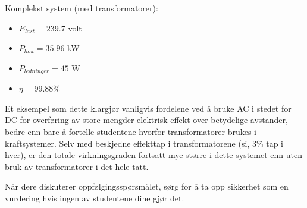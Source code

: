 Komplekst system (med transformatorer):

\begin{itemize}
\item {} $E_{last} = 239.7$ volt
\item {} $P_{last} = 35.96$ kW
\item {} $P_{ledninger} = 45$ W
\item {} $\eta = 99.88 \%$ 
\end{itemize}







Et eksempel som dette klargjør vanligvis fordelene ved å bruke AC i stedet for DC for overføring av store mengder elektrisk effekt over betydelige avstander, bedre enn bare å fortelle studentene hvorfor transformatorer brukes i kraftsystemer. Selv med beskjedne effekttap i transformatorene (si, 3\% tap i hver), er den totale virkningsgraden fortsatt mye større i dette systemet enn uten bruk av transformatorer i det hele tatt.

Når dere diskuterer oppfølgingsspørsmålet, sørg for å ta opp sikkerhet som en vurdering hvis ingen av studentene dine gjør det.


